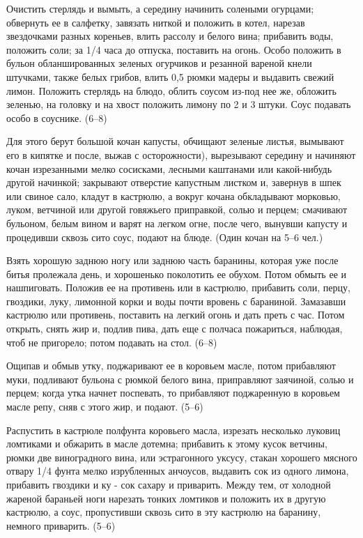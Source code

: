 
Очистить стерлядь и вымыть, а середину начинить солеными огурцами; обвернуть ее в салфетку, завязать ниткой и положить в котел, нарезав звездочками разных кореньев, влить рассолу и белого вина; прибавить воды, положить соли; за 1/4 часа до отпуска, поставить на огонь. Особо положить в бульон обланшированных зеленых огурчиков и резанной вареной кнели штучками, также белых грибов, влить 0,5 рюмки мадеры и выдавить свежий лимон. Положить стерлядь на блюдо, облить соусом из-под нее же, обложить зеленью, на головку и на хвост положить лимону по 2 и 3 штуки. Соус подавать особо в соуснике. (6--8) 


Для этого берут большой кочан капусты, обчищают зеленые листья, вымывают его в кипятке и после, выжав с осторожности), вырезывают середину и начиняют кочан изрезанными мелко сосисками, лесными каштанами или какой-нибудь другой начинкой; закрывают отверстие капустным листком и, завернув в шпек или свиное сало, кладут в кастрюлю, а вокруг кочана обкладывают морковью, луком, ветчиной или другой говяжьего приправкой, солью и перцем; смачивают бульоном, белым вином и варят на легком огне, после чего, вынувши капусту и процедивши сквозь сито соус, подают на блюде. (Один кочан на 5--6 чел.) 


Взять хорошую заднюю ногу или заднюю часть баранины, которая уже после битья пролежала день, и хорошенько поколотить ее обухом. Потом обмыть ее и нашпиговать. Положив ее на противень или в кастрюлю, прибавить соли, перцу, гвоздики, луку, лимонной корки и воды почти вровень с бараниной. Замазавши кастрюлю или противень, поставить на легкий огонь и дать преть с час. Потом открыть, снять жир и, подлив пива, дать еще с полчаса пожариться, наблюдая, чтоб не пригорело; потом подавать на стол. (6--8)


Ощипав и обмыв утку, поджаривают ее в коровьем масле, потом прибавляют муки, подливают бульона с рюмкой белого вина, приправляют заячиной, солью и перцем; когда утка начнет поспевать, то прибавляют поджаренную в коровьем масле репу, сняв с этого жир, и подают. (5--6) 


Распустить в кастрюле полфунта коровьего масла, изрезать несколько луковиц ломтиками и обжарить в масле дотемна; прибавить к этому кусок ветчины, рюмки две виноградного вина, или эстрагонного уксусу, стакан хорошего мясного отвару 1/4 фунта мелко изрубленных анчоусов, выдавить сок из одного лимона, прибавить гвоздики и ку - сок сахару и приварить. Между тем, от холодной жареной бараньей ноги нарезать тонких ломтиков и положить их в другую кастрюлю, а соус, пропустивши сквозь сито в эту кастрюлю на баранину, немного приварить. (5--6) 

